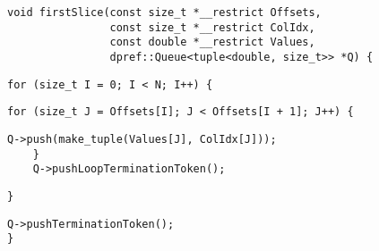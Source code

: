 \begin{lstlisting}[style=cppcode]
void firstSlice(const size_t *__restrict Offsets,
                const size_t *__restrict ColIdx,
                const double *__restrict Values,
                dpref::Queue<tuple<double, size_t>> *Q) {
\end{lstlisting}\vspace{-\baselineskip}

\begin{lstlisting}[style=cppcode, backgroundcolor=\color{yellow!15}, firstnumber=last]
  for (size_t I = 0; I < N; I++) {
\end{lstlisting}\vspace{-\baselineskip}

\begin{lstlisting}[style=cppcode, backgroundcolor=\color{green!15}, firstnumber=last]
    for (size_t J = Offsets[I]; J < Offsets[I + 1]; J++) {
\end{lstlisting}\vspace{-\baselineskip}

\begin{lstlisting}[style=cppcode, firstnumber=last]
      Q->push(make_tuple(Values[J], ColIdx[J]));
    }
    Q->pushLoopTerminationToken();
\end{lstlisting}\vspace{-\baselineskip}

\begin{lstlisting}[style=cppcode, backgroundcolor=\color{yellow!15}, firstnumber=last]
  }
\end{lstlisting}\vspace{-\baselineskip}

\begin{lstlisting}[style=cppcode, firstnumber=last]
  Q->pushTerminationToken();
}
\end{lstlisting}\vspace{-\baselineskip}
